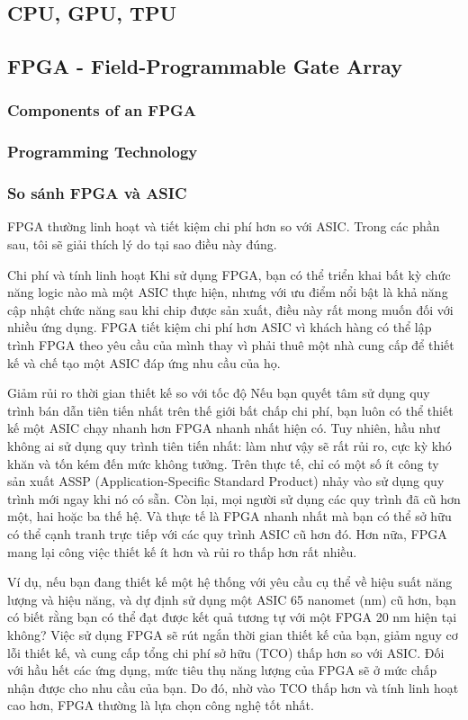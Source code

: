 \documentclass[a4paper]{article}
\begin{document}
\subsection{CPU, GPU, TPU}
\subsection{FPGA - Field-Programmable Gate Array}
\subsubsection{Components of an FPGA}
\subsubsection{Programming Technology}

\subsubsection{So sánh FPGA và ASIC}
FPGA thường linh hoạt và tiết kiệm chi phí hơn so với ASIC. Trong các phần sau, tôi sẽ giải thích lý do tại sao điều này đúng.

Chi phí và tính linh hoạt
Khi sử dụng FPGA, bạn có thể triển khai bất kỳ chức năng logic nào mà một ASIC thực hiện, nhưng với ưu điểm nổi bật là khả năng cập nhật chức năng sau khi chip được sản xuất, điều này rất mong muốn đối với nhiều ứng dụng. FPGA tiết kiệm chi phí hơn ASIC vì khách hàng có thể lập trình FPGA theo yêu cầu của mình thay vì phải thuê một nhà cung cấp để thiết kế và chế tạo một ASIC đáp ứng nhu cầu của họ.

Giảm rủi ro thời gian thiết kế so với tốc độ
Nếu bạn quyết tâm sử dụng quy trình bán dẫn tiên tiến nhất trên thế giới bất chấp chi phí, bạn luôn có thể thiết kế một ASIC chạy nhanh hơn FPGA nhanh nhất hiện có. Tuy nhiên, hầu như không ai sử dụng quy trình tiên tiến nhất: làm như vậy sẽ rất rủi ro, cực kỳ khó khăn và tốn kém đến mức không tưởng. Trên thực tế, chỉ có một số ít công ty sản xuất ASSP (Application-Specific Standard Product) nhảy vào sử dụng quy trình mới ngay khi nó có sẵn. Còn lại, mọi người sử dụng các quy trình đã cũ hơn một, hai hoặc ba thế hệ. Và thực tế là FPGA nhanh nhất mà bạn có thể sở hữu có thể cạnh tranh trực tiếp với các quy trình ASIC cũ hơn đó. Hơn nữa, FPGA mang lại công việc thiết kế ít hơn và rủi ro thấp hơn rất nhiều.

Ví dụ, nếu bạn đang thiết kế một hệ thống với yêu cầu cụ thể về hiệu suất năng lượng và hiệu năng, và dự định sử dụng một ASIC 65 nanomet (nm) cũ hơn, bạn có biết rằng bạn có thể đạt được kết quả tương tự với một FPGA 20 nm hiện tại không? Việc sử dụng FPGA sẽ rút ngắn thời gian thiết kế của bạn, giảm nguy cơ lỗi thiết kế, và cung cấp tổng chi phí sở hữu (TCO) thấp hơn so với ASIC. Đối với hầu hết các ứng dụng, mức tiêu thụ năng lượng của FPGA sẽ ở mức chấp nhận được cho nhu cầu của bạn. Do đó, nhờ vào TCO thấp hơn và tính linh hoạt cao hơn, FPGA thường là lựa chọn công nghệ tốt nhất.
\end{document}
